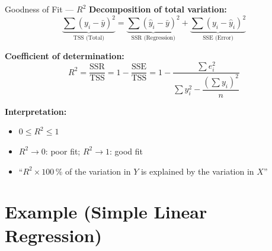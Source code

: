 \documentclass[12pt, aspectratio=169]{beamer}
\begin{document}
    \begin{frame}{Goodness of Fit --- $R^2$}
        \textbf{Decomposition of total variation:}
        \[
            \underbrace{\sum(y_i - \bar{y})^2}_{\text{TSS (Total)}}
            = \underbrace{\sum(\hat{y}_i - \bar{y})^2}_{\text{SSR (Regression)}}
            + \underbrace{\sum(y_i - \hat{y}_i)^2}_{\text{SSE (Error)}}
        \]

        \vspace{0.5em}

        \textbf{Coefficient of determination:}
        \[
            R^2 = \frac{\text{SSR}}{\text{TSS}} = 1 - \frac{\text{SSE}}{\text{TSS}}
            = 1 - \frac{\sum e_i^2}{\sum y_i^2 - \dfrac{(\sum y_i)^2}{n}}
        \]

        \textbf{Interpretation:}
        \begin{itemize}
            \item $0 \leqslant R^2 \leqslant 1$
            \item $R^2 \to 0$: poor fit; $R^2 \to 1$: good fit
            \item ``$R^2 \times 100$\,\% of the variation in $Y$ is explained
                by the variation in $X$''
        \end{itemize}
    \end{frame}


    \section{Example (Simple Linear Regression)}
\end{document}
